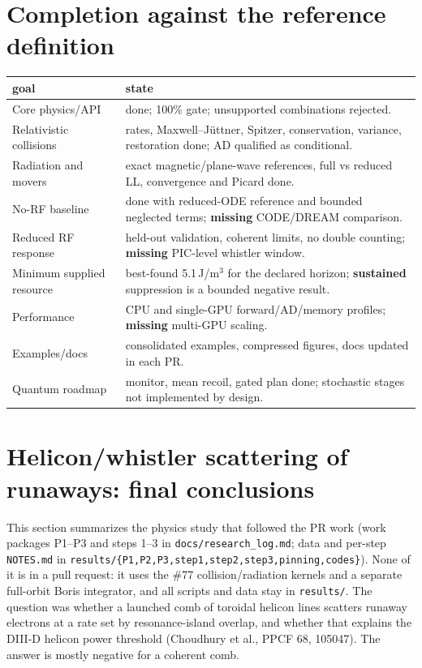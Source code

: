 \documentclass[10pt,a4paper]{article}
\begin{document}
\section{Completion against the reference definition}
\begin{table}[H]\centering\small\begin{tabular}{@{}lp{12cm}@{}}\toprule
goal & state\\\midrule
Core physics/API & done; 100\% gate; unsupported combinations rejected.\\
Relativistic collisions & rates, Maxwell--Jüttner, Spitzer, conservation, variance, restoration done; AD qualified as conditional.\\
Radiation and movers & exact magnetic/plane-wave references, full vs reduced LL, convergence and Picard done.\\
No-RF baseline & done with reduced-ODE reference and bounded neglected terms; \textbf{missing} CODE/DREAM comparison.\\
Reduced RF response & held-out validation, coherent limits, no double counting; \textbf{missing} PIC-level whistler window.\\
Minimum supplied resource & best-found 5.1\,J/m$^3$ for the declared horizon; \textbf{sustained} suppression is a bounded negative result.\\
Performance & CPU and single-GPU forward/AD/memory profiles; \textbf{missing} multi-GPU scaling.\\
Examples/docs & consolidated examples, compressed figures, docs updated in each PR.\\
Quantum roadmap & monitor, mean recoil, gated plan done; stochastic stages not implemented by design.\\\bottomrule
\end{tabular}\end{table}


\section{Helicon/whistler scattering of runaways: final conclusions}\label{sec:helicon}
This section summarizes the physics study that followed the PR work (work packages P1--P3 and steps 1--3 in
\texttt{docs/research\_log.md}; data and per-step \texttt{NOTES.md} in \texttt{results/\{P1,P2,P3,step1,step2,step3,pinning,codes\}}).
None of it is in a pull request: it uses the \#77 collision/radiation kernels and a separate full-orbit Boris
integrator, and all scripts and data stay in \texttt{results/}. The question was whether a launched comb of
toroidal helicon lines scatters runaway electrons at a rate set by resonance-island overlap, and whether that
explains the DIII-D helicon power threshold (Choudhury et al., PPCF 68, 105047). The answer is mostly negative for a coherent comb.
\end{document}

